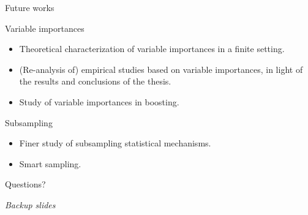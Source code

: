 \documentclass{beamer}
\begin{document}
\begin{frame}{Future works}

\begin{block}{Variable importances}
\begin{itemize}
\item Theoretical characterization of variable importances in a finite setting.
\item (Re-analysis of) empirical studies based on variable importances, in light
of the results and conclusions of the thesis.
\item Study of variable importances in boosting.
\end{itemize}
\end{block}

\begin{block}{Subsampling}
\begin{itemize}
\item Finer study of subsampling statistical mechanisms.
\item Smart sampling.
\end{itemize}
\end{block}

\end{frame}


\appendix

\begin{frame}
\begin{center}
{\Huge  Questions?}
\end{center}
\end{frame}


\begin{frame}

\begin{center}
{\it Backup slides}
\end{center}

\end{frame}
\end{document}
